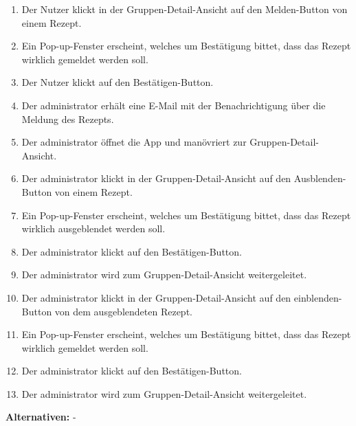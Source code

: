 \documentclass[parskip=full]{scrartcl}
\begin{document}
\begin{enumerate}
    \item Der Nutzer klickt in der Gruppen-Detail-Ansicht auf den Melden-Button von einem Rezept.
    \item Ein Pop-up-Fenster erscheint, welches um Bestätigung bittet, dass das Rezept wirklich gemeldet werden soll.
    \item Der Nutzer klickt auf den Bestätigen-Button.
    \item Der \Gls{administrator} erhält eine E-Mail mit der Benachrichtigung über die Meldung des Rezepts.
    \item Der \Gls{administrator} öffnet die App und manövriert zur Gruppen-Detail-Ansicht.
    \item Der \Gls{administrator} klickt in der Gruppen-Detail-Ansicht auf den Ausblenden-Button von einem Rezept.
    \item Ein Pop-up-Fenster erscheint, welches um Bestätigung bittet, dass das Rezept wirklich ausgeblendet werden soll.
    \item Der \Gls{administrator} klickt auf den Bestätigen-Button.
    \item Der \Gls{administrator} wird zum Gruppen-Detail-Ansicht weitergeleitet.
    \item Der \Gls{administrator} klickt in der Gruppen-Detail-Ansicht auf den einblenden-Button von dem ausgeblendeten Rezept.
    \item Ein Pop-up-Fenster erscheint, welches um Bestätigung bittet, dass das Rezept wirklich gemeldet werden soll.
    \item Der \Gls{administrator} klickt auf den Bestätigen-Button.
    \item Der \Gls{administrator} wird zum Gruppen-Detail-Ansicht weitergeleitet.
\end{enumerate}
\textbf{Alternativen:} -
\newpage
\end{document}
